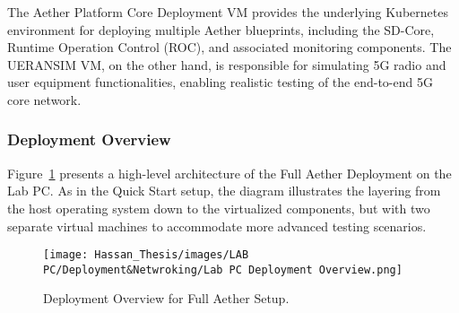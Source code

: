 \begin{table}[htbp]
    \centering
    \caption{UERANSIM VM Configuration}
    \label{tab:ueransim-vm}
\end{table}

The Aether Platform Core Deployment VM provides the underlying Kubernetes environment for deploying multiple Aether blueprints, including the SD-Core, Runtime Operation Control (ROC), and associated monitoring components. The UERANSIM VM, on the other hand, is responsible for simulating 5G radio and user equipment functionalities, enabling realistic testing of the end-to-end 5G core network.

\subsubsection{Deployment Overview}

Figure~\ref{fig:lab-pc-deployment-overview} presents a high-level architecture of the Full Aether Deployment on the Lab PC. As in the Quick Start setup, the diagram illustrates the layering from the host operating system down to the virtualized components, but with two separate virtual machines to accommodate more advanced testing scenarios.

\begin{figure}[!htb]
    \centering
    \texttt{[image: Hassan\_Thesis/images/LAB PC/Deployment\&Netwroking/Lab PC Deployment Overview.png]}
    \caption{Deployment Overview for Full Aether Setup.}
    \label{fig:lab-pc-deployment-overview}
\end{figure}


